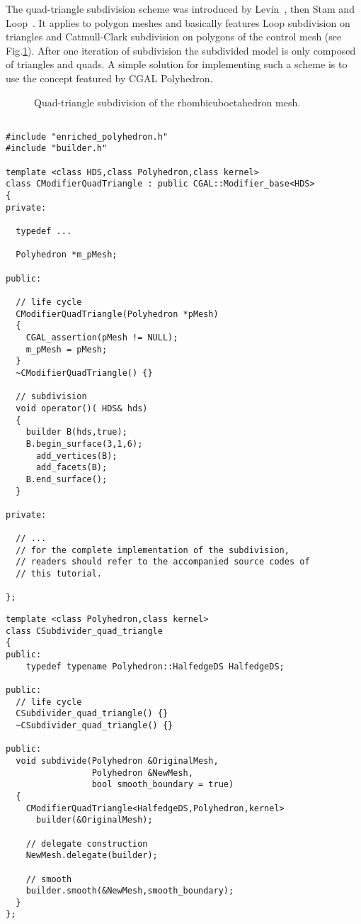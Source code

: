
The quad-triangle subdivision scheme was introduced by
Levin~\cite{l-pg-03}, then Stam and Loop~\cite{qts}. It applies
to polygon meshes and basically features Loop subdivision on triangles
and Catmull-Clark subdivision on polygons of the control mesh (see
Fig.\ref{fig:quad-triangle}). After one iteration of subdivision the
subdivided model is only composed of triangles and quads. A simple
solution for implementing such a scheme is to use the
 concept featured by CGAL 
Polyhedron.



\begin{figure}[htb]
    \caption{Quad-triangle subdivision of the rhombicuboctahedron mesh.}
    \label{fig:quad-triangle}
\end{figure}

{ \scriptsize
\begin{verbatim}

#include "enriched_polyhedron.h"
#include "builder.h"

template <class HDS,class Polyhedron,class kernel>
class CModifierQuadTriangle : public CGAL::Modifier_base<HDS>
{
private:

  typedef ...

  Polyhedron *m_pMesh;

public:

  // life cycle
  CModifierQuadTriangle(Polyhedron *pMesh)
  {
    CGAL_assertion(pMesh != NULL);
    m_pMesh = pMesh;
  }
  ~CModifierQuadTriangle() {}

  // subdivision
  void operator()( HDS& hds)
  {
    builder B(hds,true);
    B.begin_surface(3,1,6);
      add_vertices(B);
      add_facets(B);
    B.end_surface();
  }

private:

  // ... 
  // for the complete implementation of the subdivision, 
  // readers should refer to the accompanied source codes of 
  // this tutorial.
  
};
\end{verbatim}}

{ \scriptsize
\begin{verbatim}
template <class Polyhedron,class kernel>
class CSubdivider_quad_triangle
{
public:
    typedef typename Polyhedron::HalfedgeDS HalfedgeDS;

public:
  // life cycle
  CSubdivider_quad_triangle() {}
  ~CSubdivider_quad_triangle() {}

public:
  void subdivide(Polyhedron &OriginalMesh,
                 Polyhedron &NewMesh,
                 bool smooth_boundary = true)
  {
    CModifierQuadTriangle<HalfedgeDS,Polyhedron,kernel> 
      builder(&OriginalMesh);

    // delegate construction 
    NewMesh.delegate(builder);

    // smooth
    builder.smooth(&NewMesh,smooth_boundary);
  }
};
\end{verbatim}}
